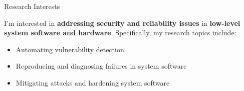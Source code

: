 \begin{rSection}{Research Interests}
\newcommand{\eg}{\textit{e}.\textit{g}.\xspace}

I'm interested in \textbf{addressing security and reliability issues}
in \textbf{low-level system software and hardware}. Specifically, my
research topics include:

\begin{itemize}[leftmargin=*,itemsep=-5pt]
\item{Automating vulnerability detection}
\item{Reproducing and diagnosing failures in system software}
\item{Mitigating attacks and hardening system software}
\end{itemize}


\end{rSection}
